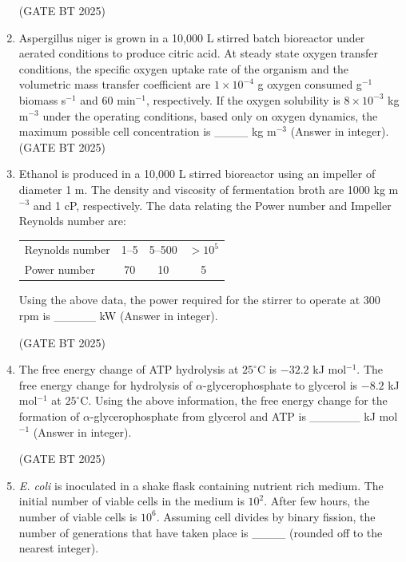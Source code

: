 \documentclass[journal,12pt,onecolumn]{IEEEtran}
\theoremstyle{remark}
\begin{document}
\begin{enumerate}
\hfill (GATE BT 2025)

\item
Aspergillus niger is grown in a 10,000 L stirred batch bioreactor under aerated conditions to produce citric acid. At steady state oxygen transfer conditions, the specific oxygen uptake rate of the organism and the volumetric mass transfer coefficient are $1\times10^{-4}$ g oxygen consumed g$^{-1}$ biomass s$^{-1}$ and $60$ min$^{-1}$, respectively. If the oxygen solubility is $8\times10^{-3}$ kg m$^{-3}$ under the operating conditions, based only on oxygen dynamics, the maximum possible cell concentration is \_\_\_\_ kg m$^{-3}$ (Answer in integer).
\hfill (GATE BT 2025)

\item Ethanol is produced in a 10{,}000 L stirred bioreactor using an impeller of diameter 1 m. The density and viscosity of fermentation broth are 1000 kg m$^{-3}$ and 1 cP, respectively. The data relating the Power number and Impeller Reynolds number are:

\begin{center}
\begin{tabular}{lccc}
\hline
Reynolds number & 1--5 & 5--500 & $> 10^5$ \\
Power number & 70 & 10 & 5 \\
\hline
\end{tabular}
\end{center}

Using the above data, the power required for the stirrer to operate at 300 rpm is \_\_\_\_\_ kW (Answer in integer).

\hfill (GATE BT 2025)

\item The free energy change of ATP hydrolysis at $25^\circ$C is $-32.2$ kJ mol$^{-1}$. The free energy change for hydrolysis of $\alpha$-glycerophosphate to glycerol is $-8.2$ kJ mol$^{-1}$ at $25^\circ$C. Using the above information, the free energy change for the formation of $\alpha$-glycerophosphate from glycerol and ATP is \_\_\_\_\_\_ kJ mol$^{-1}$ (Answer in integer).

\hfill (GATE BT 2025)

\item \textit{E. coli} is inoculated in a shake flask containing nutrient rich medium. The initial number of viable cells in the medium is $10^2$. After few hours, the number of viable cells is $10^6$. Assuming cell divides by binary fission, the number of generations that have taken place is \_\_\_\_ (rounded off to the nearest integer).


\end{enumerate}
\end{document}
